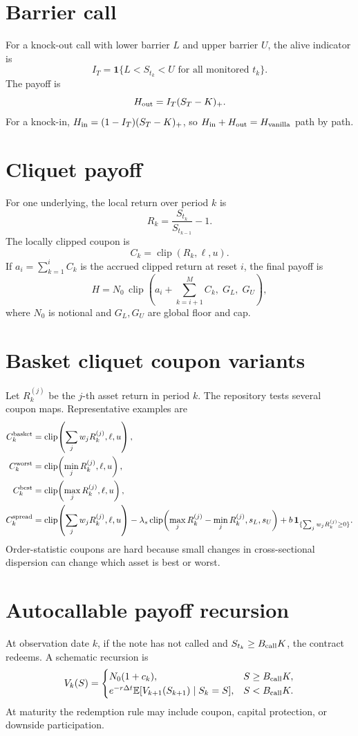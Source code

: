 \documentclass[11pt,oneside]{book}
\theoremstyle{definition}
\newcommand{\E}{\mathbb{E}}
\newcommand{\clip}{\operatorname{clip}}
\begin{document}
\section{Barrier call}
For a knock-out call with lower barrier \(L\) and upper barrier \(U\), the alive indicator is
\[
  I_T=
  \mathbf 1\{L<S_{t_k}<U \text{ for all monitored } t_k\}.
\]
The payoff is
\[
  H_{\rm out}=I_T(S_T-K)_+.
\]
For a knock-in, \(H_{\rm in}=(1-I_T)(S_T-K)_+\), so \(H_{\rm in}+H_{\rm out}=H_{\rm vanilla}\) path by path.

\section{Cliquet payoff}
For one underlying, the local return over period \(k\) is
\[
  R_k=\frac{S_{t_k}}{S_{t_{k-1}}}-1.
\]
The locally clipped coupon is
\[
  C_k=\clip(R_k,\ell,u).
\]
If \(a_i=\sum_{k=1}^{i}C_k\) is the accrued clipped return at reset \(i\), the final payoff is
\[
  H=N_0\,\clip\!\left(a_i+\sum_{k=i+1}^{M}C_k,\;G_L,\;G_U\right),
\]
where \(N_0\) is notional and \(G_L,G_U\) are global floor and cap.

\section{Basket cliquet coupon variants}
Let \(R_k^{(j)}\) be the \(j\)-th asset return in period \(k\). The repository tests several coupon maps. Representative examples are
\[
\begin{aligned}
C_k^{\rm basket}
  &= \clip\!\left(\sum_j w_j R_k^{(j)},\ell,u\right),\\
C_k^{\rm worst}
  &= \clip\!\left(\min_j R_k^{(j)},\ell,u\right),\\
C_k^{\rm best}
  &= \clip\!\left(\max_j R_k^{(j)},\ell,u\right),\\
C_k^{\rm spread}
  &= \clip\!\left(\sum_j w_jR_k^{(j)},\ell,u\right)
     -\lambda_s\clip\!\left(\max_jR_k^{(j)}-\min_jR_k^{(j)},s_L,s_U\right)
     +b\,\mathbf 1_{\{\sum_jw_jR_k^{(j)}\ge0\}}.
\end{aligned}
\]
Order-statistic coupons are hard because small changes in cross-sectional dispersion can change which asset is best or worst.

\section{Autocallable payoff recursion}
At observation date \(k\), if the note has not called and \(S_{t_k}\ge B_{\rm call}K\), the contract redeems. A schematic recursion is
\[
  V_k(S)=
  \begin{cases}
  N_0(1+c_k), & S\ge B_{\rm call}K,\\
  e^{-r\Delta t}\E[V_{k+1}(S_{k+1})\mid S_k=S], & S<B_{\rm call}K.
  \end{cases}
\]
At maturity the redemption rule may include coupon, capital protection, or downside participation.
\end{document}
